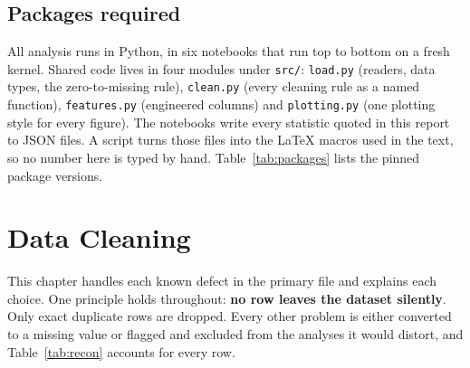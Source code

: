 \documentclass[a4paper,12pt]{report}
\newcommand{\code}[1]{\texttt{#1}}
\newcommand{\tablein}[1]{}
\begin{document}
\begin{table}[htbp]
\centering\small
\tablein{tab1_1_primary_schema}
\caption{Primary dataset as stored (\AuditPrimaryRows{} rows). ``Non-null'' counts true nulls only: the zeros that stand for unknown budget and revenue look complete here, which is exactly the trap Chapter~\ref{ch:cleaning} deals with.}
\label{tab:primary}
\end{table}

\begin{table}[htbp]
\centering\small
\tablein{tab1_2_secondary_schema}
\caption{Secondary (Kaggle) dataset as stored (\AuditSecondaryRows{} rows). It carries a TMDB \code{id} but no financial columns, so it cannot support any analysis of commercial success on its own.}
\label{tab:secondary}
\end{table}

\section{Packages required}

All analysis runs in Python, in six notebooks that run top to bottom on a fresh kernel. Shared code lives in four modules under \code{src/}: \code{load.py} (readers, data types, the zero-to-missing rule), \code{clean.py} (every cleaning rule as a named function), \code{features.py} (engineered columns) and \code{plotting.py} (one plotting style for every figure). The notebooks write every statistic quoted in this report to JSON files. A script turns those files into the LaTeX macros used in the text, so no number here is typed by hand. Table~\ref{tab:packages} lists the pinned package versions.

\begin{table}[htbp]
\centering\small
\tablein{tab1_3_packages}
\caption{Pinned package versions, generated from \code{requirements.txt}.}
\label{tab:packages}
\end{table}

\chapter{Data Cleaning}\label{ch:cleaning}

This chapter handles each known defect in the primary file and explains each choice. One principle holds throughout: \textbf{no row leaves the dataset silently}. Only exact duplicate rows are dropped. Every other problem is either converted to a missing value or flagged and excluded from the analyses it would distort, and Table~\ref{tab:recon} accounts for every row.
\end{document}
